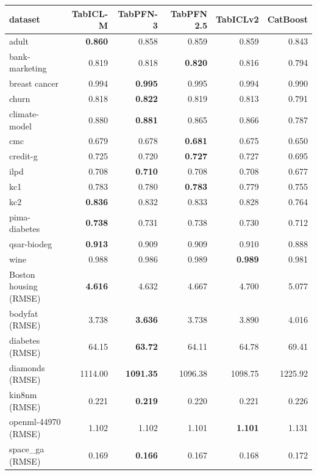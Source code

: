 \begin{tabular}{lrrrrr}
\toprule
dataset & TabICL-M & TabPFN-3 & TabPFN 2.5 & TabICLv2 & CatBoost\\
\midrule
adult & \textbf{0.860} & 0.858 & 0.859 & 0.859 & 0.843\\
bank-marketing & 0.819 & 0.818 & \textbf{0.820} & 0.816 & 0.794\\
breast cancer & 0.994 & \textbf{0.995} & 0.995 & 0.994 & 0.990\\
churn & 0.818 & \textbf{0.822} & 0.819 & 0.813 & 0.791\\
climate-model & 0.880 & \textbf{0.881} & 0.865 & 0.866 & 0.787\\
cmc & 0.679 & 0.678 & \textbf{0.681} & 0.675 & 0.650\\
credit-g & 0.725 & 0.720 & \textbf{0.727} & 0.727 & 0.695\\
ilpd & 0.708 & \textbf{0.710} & 0.708 & 0.708 & 0.677\\
kc1 & 0.783 & 0.780 & \textbf{0.783} & 0.779 & 0.755\\
kc2 & \textbf{0.836} & 0.832 & 0.833 & 0.828 & 0.764\\
pima-diabetes & \textbf{0.738} & 0.731 & 0.738 & 0.730 & 0.712\\
qsar-biodeg & \textbf{0.913} & 0.909 & 0.909 & 0.910 & 0.888\\
wine & 0.988 & 0.986 & 0.989 & \textbf{0.989} & 0.981\\
Boston housing (RMSE) & \textbf{4.616} & 4.632 & 4.667 & 4.700 & 5.077\\
bodyfat (RMSE) & 3.738 & \textbf{3.636} & 3.738 & 3.890 & 4.016\\
diabetes (RMSE) & 64.15 & \textbf{63.72} & 64.11 & 64.78 & 69.41\\
diamonds (RMSE) & 1114.00 & \textbf{1091.35} & 1096.38 & 1098.75 & 1225.92\\
kin8nm (RMSE) & 0.221 & \textbf{0.219} & 0.220 & 0.221 & 0.226\\
openml-44970 (RMSE) & 1.102 & 1.102 & 1.101 & \textbf{1.101} & 1.131\\
space\_ga (RMSE) & 0.169 & \textbf{0.166} & 0.167 & 0.168 & 0.172\\
\bottomrule
\end{tabular}